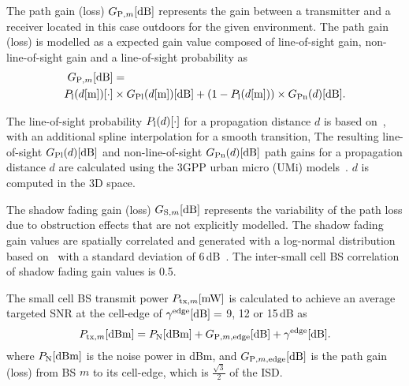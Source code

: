 \documentclass{IEEEtran}
\begin{document}
The path gain (loss) $G_{\mathrm{P},m} {\rm [dB]}$ represents the gain between a transmitter and a receiver located in this case outdoors for the given environment.
The path gain (loss) is modelled as a expected gain value composed of line-of-sight gain, non-line-of-sight gain and a line-of-sight probability as
\begin{align}
\label{path_gain}
	G_{\mathrm{P},m} {\rm [dB]} & =
	\notag\\
	P_\mathrm{l}(d  {\rm [m]}) {\rm [\cdot]}  & \times G_{\mathrm{Pl}}(d  {\rm [m]}) {\rm [dB]} + \left( 1-P_\mathrm{l}(d  {\rm [m]}) \right) \times G_{\mathrm{Pn}}(d) {\rm [dB]}.
\end{align}










The line-of-sight probability $P_\mathrm{l}(d)  {\rm [\cdot]}$  for a propagation distance $d$ is based on~\cite{TR36.814},
with an additional spline interpolation for a smooth transition,
The resulting line-of-sight $G_{\mathrm{Pl}}(d) {\rm [dB]}$ and non-line-of-sight $G_{\mathrm{Pn}}(d) {\rm [dB]}$ path gains for a propagation distance $d$
are calculated using the \ac{3GPP} urban micro (UMi) models~\cite{TR36.814}.
$d$ is computed in the 3D space.



The shadow fading gain (loss) $G_{\mathrm{S},m}  {\rm [dB]}$ represents the variability of the path loss due to obstruction effects that are not explicitly modelled.
The shadow fading gain values are spatially correlated and generated with a log-normal distribution based on~\cite{Gudmundson:91, Claussen:05b}
with a standard deviation of 6\,dB~\cite{TR36.814}.
The inter-small cell \ac{BS} correlation of shadow fading gain values is 0.5.


The small cell \ac{BS} transmit power $P_{\mathrm{tx},m}  {\rm [mW]}$ is calculated to achieve an average targeted \ac{SNR} at the cell-edge of  $\gamma^{\mathrm{edge}} {\rm [dB]}=$ 9, 12 or 15\,dB as
\begin{equation}
\label{received_power}
P_{\mathrm{tx},m}  {\rm [dBm]} = P_{\mathrm{N}} {\rm [dBm]} + G_{\mathrm{P},m,{\rm edge}} {\rm [dB]}  + \gamma^{\mathrm{edge}} {\rm [dB]}. \end{equation}
where $P_{\mathrm{N}} {\rm [dBm]}$ is the noise power in dBm,
and $G_{\mathrm{P},m,{\rm edge}} {\rm [dB]}$ is the path gain (loss) from \ac{BS} $m$ to its cell-edge,
which is $\frac{\sqrt{3}}{2}$ of the \ac{ISD}.
\end{document}
